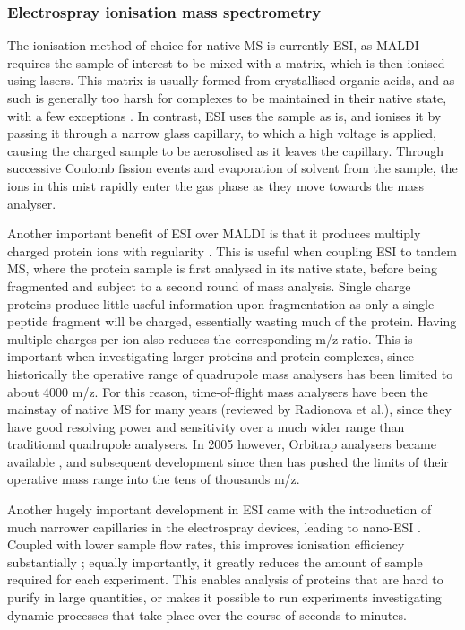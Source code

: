 \documentclass[a4paper,11pt,twoside,openright]{scrbook}
\begin{document}
\subsubsection{Electrospray ionisation mass spectrometry}
The ionisation method of choice for native MS is currently ESI, as MALDI requires the sample of interest to be mixed with a matrix, which is then ionised using lasers. This matrix is usually formed from crystallised organic acids, and as such is generally too harsh for complexes to be maintained in their native state, with a few exceptions \cite{Song2007}. In contrast, ESI uses the sample as is, and ionises it by passing it through a narrow glass capillary, to which a high voltage is applied, causing the charged sample to be aerosolised as it leaves the capillary. Through successive Coulomb fission events and evaporation of solvent from the sample, the ions in this mist rapidly enter the gas phase as they move towards the mass analyser.

Another important benefit of ESI over MALDI is that it produces multiply charged protein ions with regularity \cite{Krusemark2009}. This is useful when coupling ESI to tandem MS, where the protein sample is first analysed in its native state, before being fragmented and subject to a second round of mass analysis. Single charge proteins produce little useful information upon fragmentation as only a single peptide fragment will be charged, essentially wasting much of the protein. Having multiple charges per ion also reduces the corresponding m/z ratio. This is important when investigating larger proteins and protein complexes, since historically the operative range of quadrupole mass analysers has been limited to about 4000 m/z. For this reason, time-of-flight mass analysers have been the mainstay of native MS for many years (reviewed by Radionova et al.\cite{Radionova2016}), since they have good resolving power and sensitivity over a much wider range than traditional quadrupole analysers. In 2005 however, Orbitrap analysers became available \cite{Hu2005}, and subsequent development since then has pushed the limits of their operative mass range into the tens of thousands m/z.

Another hugely important development in ESI came with the introduction of much narrower capillaries in the electrospray devices, leading to nano-ESI \cite{Wilm1994}. Coupled with lower sample flow rates, this improves ionisation efficiency substantially \cite{El-Faramawy2005}; equally importantly, it greatly reduces the amount of sample required for each experiment. This enables analysis of proteins that are hard to purify in large quantities, or makes it possible to run experiments investigating dynamic processes that take place over the course of seconds to minutes.
\end{document}
